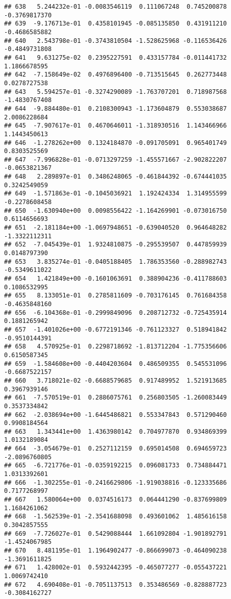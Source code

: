 \documentclass[
]{article}
\begin{document}
\begin{verbatim}
## 638   5.244232e-01 -0.0083546119  0.111067248  0.745200878 -0.3769817370
## 639  -9.176713e-01  0.4358101945 -0.085135850  0.431911210 -0.4686585882
## 640   2.543798e-01 -0.3743810504 -1.528625968 -0.116536426 -0.4849731808
## 641   9.631275e-02  0.2395227591  0.433157784 -0.011441732  1.1866678595
## 642  -7.158649e-02  0.4976896400 -0.713515645  0.262773448  0.0278727538
## 643   5.594257e-01 -0.3274290089 -1.763707201  0.718987568 -1.4830767408
## 644  -9.884480e-01  0.2108300943 -1.173604879  0.553038687  2.0086228684
## 645  -7.907617e-01  0.4670646011 -1.318930516  1.143466966  1.1443450613
## 646  -1.278262e+00  0.1324184870 -0.091705091  0.965401749  0.8303525569
## 647  -7.996828e-01 -0.0713297259 -1.455571667 -2.902822207 -0.0653821367
## 648   2.289897e-01  0.3486248065 -0.461844392 -0.674441035  0.3242549059
## 649  -1.571863e-01 -0.1045036921  1.192424334  1.314955599 -0.2278608458
## 650  -1.630940e+00  0.0098556422 -1.164269901 -0.073016750  0.6114656693
## 651  -2.181184e+00 -1.0697948651 -0.639040520  0.964648282 -1.3322112311
## 652  -7.045439e-01  1.9324810875 -0.295539507  0.447859939  0.0148797390
## 653   3.835274e-01 -0.0405188405  1.786353560 -0.288982743 -0.5349611022
## 654   1.421849e+00 -0.1601063691  0.388904236 -0.411788603  0.1086532995
## 655   8.133051e-01  0.2785811609 -0.703176145  0.761684358 -0.4635848160
## 656  -6.104368e-01 -0.2999849096  0.208712732 -0.725435914  0.1881265942
## 657  -1.401026e+00 -0.6772191346 -0.761123327  0.518941842 -0.9510144391
## 658   4.570925e-01  0.2298718692 -1.813712204 -1.775356606  0.6150587345
## 659  -1.584608e+00 -0.4404203604  0.486509355  0.545531096 -0.6687522157
## 660   3.718021e-02 -0.6688579685  0.917489952  1.521913685  0.3967939146
## 661  -7.570519e-01  0.2886075761  0.256803505 -1.260083449  0.3537334842
## 662  -2.038694e+00 -1.6445486821  0.553347843  0.571290460  0.9908184564
## 663   1.343441e+00  1.4363980142  0.704977870  0.934869399  1.0132189084
## 664  -3.054679e-01  0.2527112159  0.695014508  0.694659723 -2.0896760805
## 665  -6.721776e-01 -0.0359192215  0.096081733  0.734884471  1.0313392601
## 666  -1.302255e-01 -0.2416629806 -1.919038816 -0.123335686  0.7177268997
## 667   1.580064e+00  0.0374516173  0.064441290 -0.837699809  1.1684261062
## 668  -1.562539e-01 -2.3541688098  0.493601062  1.485616158  0.3042857555
## 669  -7.726027e-01  0.5429088444  1.661092804 -1.901892791 -1.4524067985
## 670   8.481195e-01  1.1964902477 -0.866699073 -0.464090238 -1.3691611825
## 671   1.428002e-01  0.5932442395 -0.465077277 -0.055437221  1.0069742410
## 672   4.690408e-01 -0.7051137513  0.353486569 -0.828887723 -0.3084162727

\end{verbatim}
\end{document}
